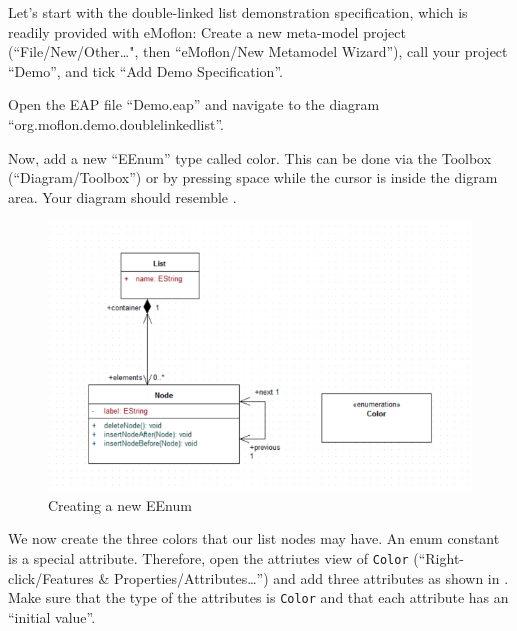 \genHeader

\begin{stepbystep}

\item 
Let's start with the double-linked list demonstration specification, which is
readily provided with eMoflon:
Create a new meta-model project (``File/New/Other\dots", then ``eMoflon/New
Metamodel Wizard''), call your project ``Demo'', and tick ``Add Demo
Specification''.

\item 
Open the EAP file ``Demo.eap'' and navigate to the diagram
``org.\-moflon.\-demo.\-doublelinkedlist''.

\item 
Now, add a new ``EEnum'' type called color.
This can be done via the Toolbox (``Diagram/Toolbox'') or by pressing space
while the cursor is inside the digram area.
Your diagram should resemble .

\begin{figure}[htbp]
    \begin{center} 
        \includegraphics[width=.8\textwidth]{../../org.moflon.doc.handbook.05_miscellaneous/9_CreatingAndUsingEnums/images/visCreateEEnum}
        \caption{Creating a new EEnum}  
        \label{enums:vis:createEEnum}
    \end{center}
\end{figure}

\item 
We now create the three colors that our list nodes may have.
An enum constant is a special attribute.
Therefore, open the attriutes view of \texttt{Color} (``Right-click/Features \&
Properties/Attributes\dots'') and add three attributes as shown in
.
Make sure that the type of the attributes is \texttt{Color} and that each
attribute has an ``initial value''.


\end{stepbystep}
